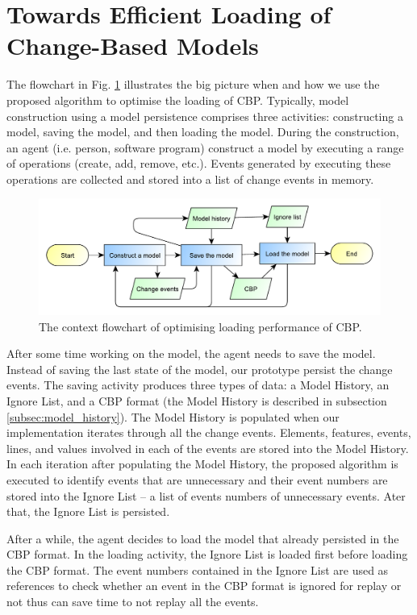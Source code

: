 \documentclass{llncs}
\begin{document}
\section{Towards Efficient Loading of Change-Based Models}
\label{sec:loading_time_optimisation}
The flowchart in Fig. \ref{fig:flowchart} illustrates the big picture when and how we use the proposed algorithm to optimise the loading of CBP. Typically, model construction using a model persistence comprises three activities: constructing a model, saving the model, and then loading the model. During the construction, an agent (i.e. person, software program) construct a model by executing a range of operations (create, add, remove, etc.). Events generated by executing these operations are collected and stored into a list of change events in memory. 

\begin{figure}[ht]
\centering
\includegraphics[width=\linewidth]{flowchart}
\caption{The context flowchart of optimising loading performance of CBP.}
\label{fig:flowchart}
\end{figure}

After some time working on the model, the agent needs to save the model. Instead of saving the last state of the model, our prototype persist the change events. The saving activity produces three types of data: a Model History, an Ignore List, and a CBP format (the Model History is described in subsection \ref{subsec:model_history}). The Model History is populated when our implementation iterates through all the change events. Elements, features, events, lines, and values involved in each of the events are stored into the Model History. In each iteration after populating the Model History, the proposed algorithm is executed to identify events that are unnecessary and their event numbers are stored into the Ignore List -- a list of events numbers of unnecessary events. Ater that, the Ignore List is persisted. 

After a while, the agent decides to load the model that already persisted in the CBP format. In the loading activity, the Ignore List is loaded first before loading the CBP format. The event numbers contained in the Ignore List are used as references to check whether an event in the CBP format is ignored for replay or not thus can save time to not replay all the events.   
\end{document}
